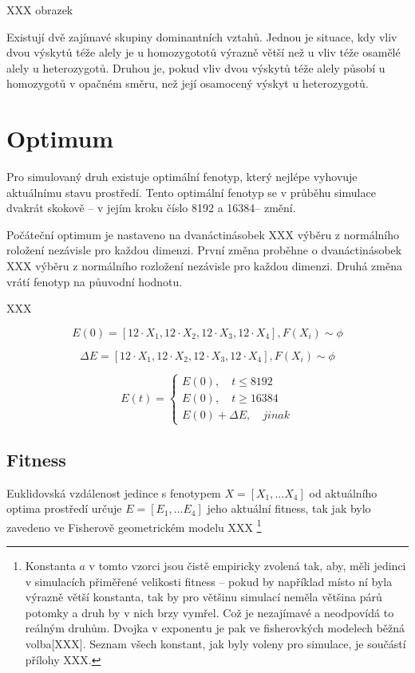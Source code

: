 XXX obrazek

Existují dvě zajímavé skupiny dominantních vztahů. Jednou je situace, kdy vliv dvou výskytů téže alely je u homozygototů výrazně větší než u vliv téže osamělé alely u heterozygotů. Druhou je, pokud vliv dvou výskytů téže alely působí u homozygotů v opačném směru, než její osamocený výskyt u heterozygotů.



\section{Optimum}

Pro simulovaný druh existuje optimální fenotyp, který nejlépe vyhovuje aktuálnímu stavu prostředí.
Tento optimální fenotyp se v průběhu simulace dvakrát skokově -- v jejím kroku číslo 8192 a 16384-- změní.

Počáteční optimum je nastaveno na dvanáctinásobek XXX výběru z normálního roložení nezávisle pro každou dimenzi.
První změna proběhne o dvanáctinásobek XXX  výběru z normálního rozložení nezávisle pro každou dimenzi. Druhá změna
vrátí fenotyp na půuvodní hodnotu.

XXX

\begin{equation}
E(0) =  [12{\cdot}X_1, 12{\cdot}X_2, 12{\cdot}X_3, 12{\cdot}X_4], F(X_i) \sim \phi
\end{equation}

\begin{equation}
\Delta{E} = [12{\cdot}X_1, 12{\cdot}X_2, 12{\cdot}X_3, 12{\cdot}X_4], F(X_i) \sim \phi
\end{equation}

\begin{equation}
E(t) = \left \{
     \begin{array}{l} E(0), \quad t \leq 8192 \\
                      E(0), \quad t \geq 16384 \\
                      E(0) + \Delta{E}, \quad jinak
     \end{array} \right .
\end{equation}

\subsection{Fitness}

Euklidovská vzdálenost jedince s fenotypem $X = [X_1,\dots{}X_4]$ od aktuálního optima prostředí určuje
$E = [E_1,\dots{} E_4]$ jeho aktuální fitness, tak jak bylo zavedeno ve Fisherově geometrickém modelu XXX
\footnote{Konstanta $a$ v tomto vzorci jsou čistě empiricky zvolená tak, aby, měli jedinci v simulacích
přiměřené velikosti fitness -- pokud by například místo ní byla výrazně větší konstanta, tak by pro většinu simulací
neměla většina párů potomky a druh by v nich brzy vymřel. Což je nezajímavé a neodpovídá to reálným druhům.
Dvojka v exponentu je pak ve fisherovkých modelech běžná volba[XXX].
Seznam všech konstant, jak byly voleny pro simulace, je součástí přílohy XXX.}

